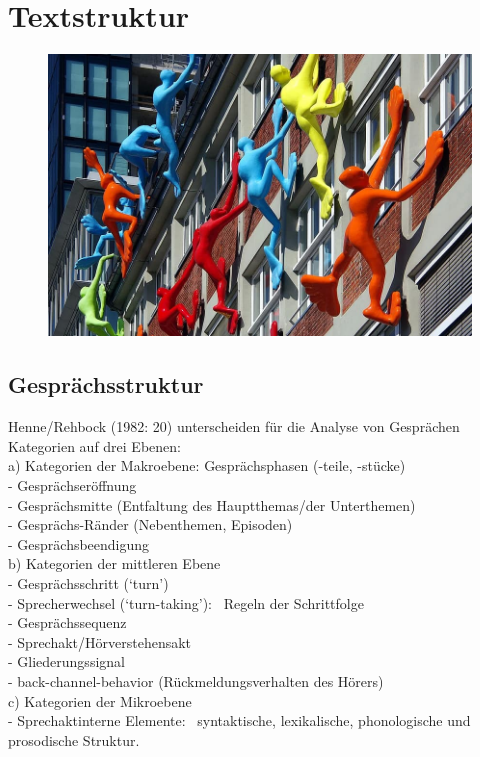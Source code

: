 \documentclass[
  letterpaper,
]{scrbook}
\begin{document}
\hypertarget{textstruktur}{%
\chapter{Textstruktur}\label{textstruktur}}

\begin{figure}

{\centering 

\href{https://p0.pikist.com/photos/252/925/dusseldorf-germany-building-structure-facade-architecture-figures-spiderman-unique.jpg}{\includegraphics[width=1\textwidth,height=\textheight]{./pictures/dusseldorf_spiderman.jpg}}

}

\end{figure}

\hypertarget{gespruxe4chsstruktur}{%
\section{Gesprächsstruktur}\label{gespruxe4chsstruktur}}

Henne/Rehbock (1982: 20) unterscheiden für die Analyse von Gesprächen
Kategorien auf drei Ebenen:\\
a) Kategorien der Makroebene: Gesprächsphasen (-teile, -stücke)\\
- Gesprächseröffnung\\
- Gesprächsmitte (Entfaltung des Hauptthemas/der Unterthemen)\\
- Gesprächs-Ränder (Nebenthemen, Episoden)\\
- Gesprächsbeendigung\\
b) Kategorien der mittleren Ebene\\
- Gesprächsschritt (`turn')\\
- Sprecherwechsel (`turn-taking'): ~Regeln der Schrittfolge\\
- Gesprächssequenz\\
- Sprechakt/Hörverstehensakt\\
- Gliederungssignal\\
- back-channel-behavior (Rückmeldungsverhalten des Hörers)\\
c) Kategorien der Mikroebene\\
- Sprechaktinterne Elemente: ~syntaktische, lexikalische, phonologische
und prosodische Struktur.\\
\end{document}
